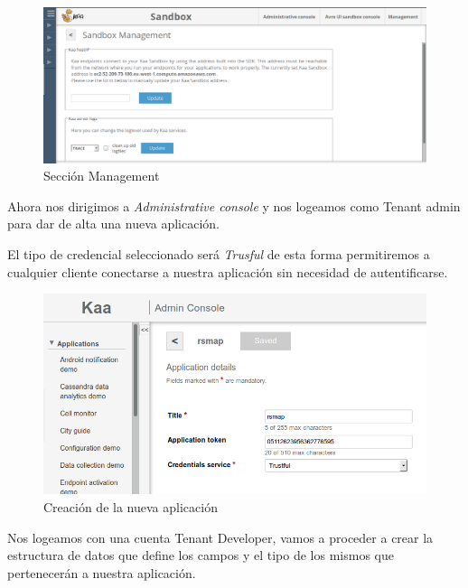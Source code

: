 \begin{figure}[!ht]
  \begin{center}
    \includegraphics[scale=0.30]{../images/kaa/8.png}
		\caption{Sección Management}
    \label{fig:kaa}
	\end{center}
\end{figure}

\newpage

Ahora nos dirigimos a \textit{Administrative console} y nos logeamos como Tenant admin para dar de alta una nueva aplicación.

El tipo de credencial seleccionado será \textit{Trusful} de esta forma permitiremos a cualquier cliente conectarse a nuestra aplicación sin necesidad de autentificarse.

\begin{figure}[!ht]
  \begin{center}
    \includegraphics[scale=0.50]{../images/kaa/11.png}
		\caption{Creación de la nueva aplicación}
    \label{fig:kaa}
	\end{center}
\end{figure}

Nos logeamos con una cuenta Tenant Developer, vamos a proceder a crear la estructura de datos que define los campos y el tipo de los mismos que pertenecerán a nuestra aplicación.

